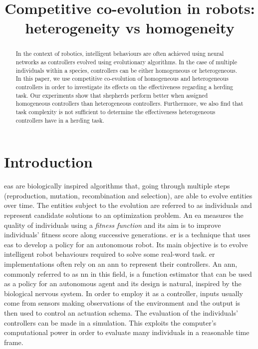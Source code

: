 \documentclass[conference]{IEEEtran}
\begin{document}
 
\title{Competitive co-evolution in robots: \\ heterogeneity vs homogeneity}



\author{
}



\maketitle


\begin{abstract}
In the context of robotics, intelligent behaviours are often achieved using neural networks as controllers evolved using  evolutionary algorithms.
In the case of multiple individuals within a species, controllers can be either homogeneous or heterogeneous.
In this paper, we use competitive co-evolution of homogeneous and heterogeneous controllers in order to investigate its effects on the effectiveness regarding a herding task.
Our experiments show that shepherds perform better when assigned homogeneous controllers than heterogeneous controllers.
Furthermore, we also find that task complexity is not sufficient to determine the effectiveness heterogeneous controllers have in a herding task.
\end{abstract}


\IEEEpeerreviewmaketitle


\section{Introduction}
\glspl{ea} are biologically inspired algorithms that, going through multiple steps (reproduction, mutation, recombination and selection), are able to evolve entities over time.
The entities subject to the evolution are referred to as individuals and represent candidate solutions to an optimization problem.
An \gls{ea} measures the quality of individuals using a \textit{fitness function} and its aim is to improve individuals' fitness score along successive generations.
\gls{er} is a technique that uses \gls{ea}s to develop a policy for an autonomous robot.
Its main objective is to evolve intelligent robot behaviours required to solve some real-word task.
\gls{er} implementations often rely on an \gls{ann} to represent their controllers.
An \gls{ann}, commonly referred to as \gls{nn} in this field, is a function estimator that can be used as a policy for an autonomous agent and its design is natural, inspired by the biological nervous system.
In order to employ it as a controller, inputs usually come from sensors making observations of the environment and the output is then used to control an actuation schema.
The evaluation of the individuals' controllers can be made in a simulation.
This exploits the computer's computational power in order to evaluate many individuals in a reasonable time frame.
\end{document}
